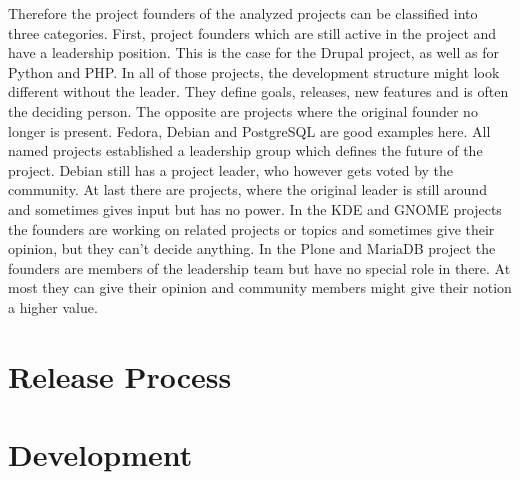 Therefore the project founders of the analyzed projects can be classified into
three categories. First, project founders which are still active in the project
and have a leadership position. This is the case for the Drupal project, as
well as for Python and PHP. In all of those projects, the development structure
might look different without the leader. They define goals, releases, new
features and is often the deciding person. The opposite are projects where the
original founder no longer is present. Fedora, Debian and PostgreSQL are good
examples here. All named projects established a leadership group which defines
the future of the project. Debian still has a project leader, who however gets
voted by the community. At last there are projects, where the original leader
is still around and sometimes gives input but has no power. In the KDE and
GNOME projects the founders are working on related projects or topics and
sometimes give their opinion, but they can't decide anything. In the Plone and
MariaDB project the founders are members of the leadership team but have no
special role in there. At most they can give their opinion and community
members might give their notion a higher value.



\section{Release Process} %
\label{sec:Release Process}


\section{Development} %
\label{sec:Development}


